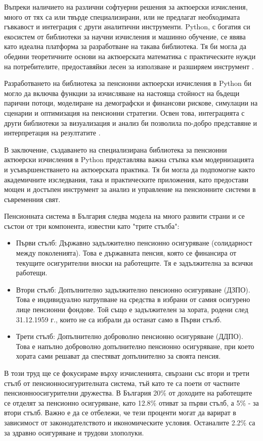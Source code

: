 \documentclass[a4paper,12pt]{article}
\begin{document}
Въпреки наличието на различни софтуерни решения за актюерски изчисления, много от тях са или твърде специализирани, или не предлагат необходимата гъвкавост и интеграция с други аналитични инструменти. Python, с богатия си екосистем от библиотеки за научни изчисления и машинно обучение, се явява като идеална платформа за разработване на такава библиотека. Тя би могла да обедини теоретичните основи на актюерската математика с практическите нужди на потребителите, предоставяйки лесен за използване и разширяем инструмент \cite{numpy2024, pandas2024}.

Разработването на библиотека за пенсионни актюерски изчисления в Python би могло да включва функции за изчисляване на настояща стойност на бъдещи парични потоци, моделиране на демографски и финансови рискове, симулации на сценарии и оптимизация на пенсионни стратегии. Освен това, интеграцията с други библиотеки за визуализация и анализ би позволила по-добро представяне и интерпретация на резултатите \cite{matplotlib2024, seaborn2024}.

В заключение, създаването на специализирана библиотека за пенсионни актюерски изчисления в Python представлява важна стъпка към модернизацията и усъвършенстването на актюерската практика. Тя би могла да подпомогне както академичните изследвания, така и практическите приложения, като предостави мощен и достъпен инструмент за анализ и управление на пенсионните системи в съвременния свят.

Пенсионната система в България следва модела на много развити страни и се състои
от три компонента, известни като "трите стълба":
\begin{itemize}
        \item Първи стълб: Държавно задължително пенсионно осигуряване (солидарност между поколенията). Това е държавната пенсия, която се финансира от текущите осигурителни вноски на работещите. Тя е задължителна за всички работещи.
        \item Втори стълб: Допълнително задължително пенсионно осигуряване (ДЗПО). Това е индивидуално натрупване на средства в избрани от самия осигурено лице пенсионни фондове. Той също е задължителен за хората, родени след 31.12.1959 г., които не са избрали да останат само в Първи стълб.
        \item Трети стълб: Допълнително доброволно пенсионно осигуряване (ДДПО). Това е напълно доброволно допълнително пенсионно осигуряване, при което хората сами решават да спестяват допълнително за своята пенсия.
\end{itemize}
В този труд ще се фокусираме върху изчисленията, свързани със втори и трети стълб от пенсионносигурителната система, тъй като те са поети от частните пенсионноосигурителни дружества. В България 20\% от доходите на работещите се отделят за пенсионно осигуряване, като 12.8\% отиват за първи стълб, а 5\% - за втори стълб. Важно е да се отбележи, че тези проценти могат да варират в зависимост от законодателството и икономическите условия. Останалите 2.2\% са за здравно осигуряване и трудови злополуки.\cite{ZDZPO_2004, ZDOO_2000}
\end{document}

